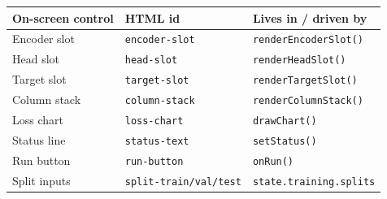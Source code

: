 \documentclass[11pt]{article}
\begin{document}
\begin{center}
\begin{tabular}{@{}p{}p{}p{}@{}}
\toprule
\textbf{On-screen control} & \textbf{HTML id} & \textbf{Lives in / driven by} \\
\midrule
Encoder slot & \lstinline{encoder-slot} & \lstinline{renderEncoderSlot()} \\
Head slot & \lstinline{head-slot} & \lstinline{renderHeadSlot()} \\
Target slot & \lstinline{target-slot} & \lstinline{renderTargetSlot()} \\
Column stack & \lstinline{column-stack} & \lstinline{renderColumnStack()} \\
Loss chart & \lstinline{loss-chart} & \lstinline{drawChart()} \\
Status line & \lstinline{status-text} & \lstinline{setStatus()} \\
Run button & \lstinline{run-button} & \lstinline{onRun()} \\
Split inputs & \lstinline{split-train/val/test} & \lstinline{state.training.splits} \\
\bottomrule
\end{tabular}
\end{center}
\end{document}
